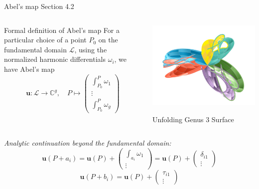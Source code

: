 \documentclass[11pt,aspectratio=169]{beamer}
\begin{document}
\begin{frame}[noframenumbering]{Abel's map}{\tiny \cite{Ber06} Section 4.2}
    \begin{columns}
        \begin{column}{0.55\textwidth}
            \begin{block}{Formal definition of Abel's map}
                For a particular choice of a point $P_0$ on the fundamental domain $\mathcal L$, using the normalized harmonic differentials $\omega_i$, we have Abel's map
                \[
                    \mathbf{u} : \mathcal L \rightarrow \mathbb{C}^g ,
                    \quad P \mapsto \begin{pmatrix} \int_{P_0}^P \omega_1 \\ \vdots \\ \int_{P_0}^P \omega_g \end{pmatrix}
                \]
            \end{block}
        \end{column}
        \begin{column}{0.45\textwidth}
            \center

            \includegraphics[width=0.7\columnwidth]{assets/Genus3Intermediate.png}

            \tiny Unfolding Genus 3 Surface
        \end{column}
    \end{columns}

    \emph{Analytic continuation beyond the fundamental domain:}
    \[\mathbf{u}(P+a_i) = \mathbf{u}(P) + \begin{pmatrix} \int_{a_i} \omega_1 \\ \vdots \end{pmatrix} = \mathbf{u}(P) + \begin{pmatrix} \delta_{i1} \\ \vdots \end{pmatrix}\]
    \[\mathbf{u}(P+b_i) = \mathbf{u}(P) + \begin{pmatrix} \tau_{i1} \\ \vdots \end{pmatrix}\]
\end{frame}
\end{document}
